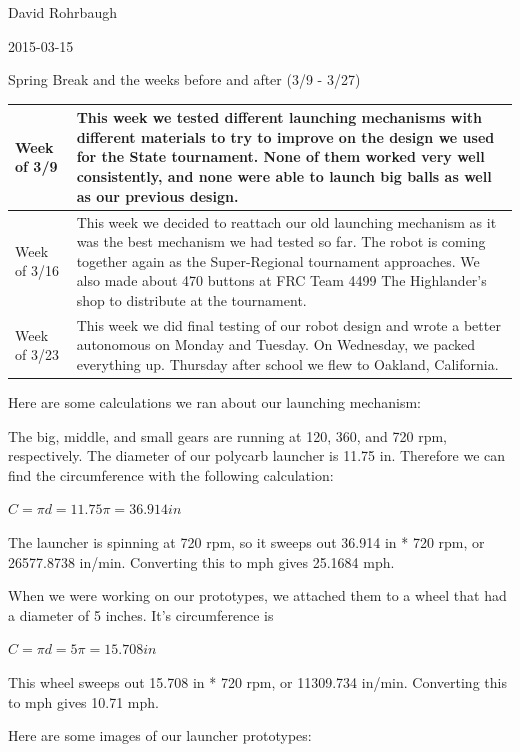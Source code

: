David Rohrbaugh

2015-03-15

Spring Break and the weeks before and after (3/9 - 3/27)

\begin{tabular}{|p{5cm}|p{5cm}|}
 \hline
 Week of 3/9&
 This week we tested different launching mechanisms with different materials to try to improve on the design we used for the State tournament. None of them worked very well consistently, and none were able to launch big balls as well as our previous design.\\
\hline
 Week of 3/16&
 This week we decided to reattach our old launching mechanism as it was the best mechanism we had tested so far. The robot is coming together again as the Super-Regional tournament approaches. We also made about 470 buttons at FRC Team 4499 The Highlander's shop to distribute at the tournament.\\
\hline
 Week of 3/23&
 This week we did final testing of our robot design and wrote a better autonomous on Monday and Tuesday. On Wednesday, we packed everything up. Thursday after school we flew to Oakland, California.\\
 \hline
\end{tabular}

\medskip

Here are some calculations we ran about our launching mechanism:

The big, middle, and small gears are running at 120, 360, and 720 rpm, respectively. The diameter of our polycarb launcher is 11.75 in. Therefore we can find the circumference with the following calculation:

$C = \pi d = 11.75\pi = 36.914 in$

The launcher is spinning at 720 rpm, so it sweeps out 36.914 in * 720 rpm, or 26577.8738 in/min. Converting this to mph gives 25.1684 mph.

When we were working on our prototypes, we attached them to a wheel that had a diameter of 5 inches. It's circumference is

$C = \pi d = 5\pi = 15.708 in$

This wheel sweeps out 15.708 in * 720 rpm, or 11309.734 in/min. Converting this to mph gives 10.71 mph. 

\pagebreak

Here are some images of our launcher prototypes:

